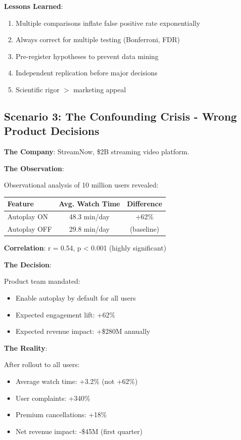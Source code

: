 \textbf{Lessons Learned}:

\begin{enumerate}
    \item Multiple comparisons inflate false positive rate exponentially
    \item Always correct for multiple testing (Bonferroni, FDR)
    \item Pre-register hypotheses to prevent data mining
    \item Independent replication before major decisions
    \item Scientific rigor $>$ marketing appeal
\end{enumerate}

\subsection{Scenario 3: The Confounding Crisis - Wrong Product Decisions}

\textbf{The Company}: StreamNow, \$2B streaming video platform.

\textbf{The Observation}:

Observational analysis of 10 million users revealed:

\begin{center}
\begin{tabular}{lcc}
\hline
\textbf{Feature} & \textbf{Avg. Watch Time} & \textbf{Difference} \\
\hline
Autoplay ON & 48.3 min/day & +62\% \\
Autoplay OFF & 29.8 min/day & (baseline) \\
\hline
\end{tabular}
\end{center}

\textbf{Correlation}: r = 0.54, p < 0.001 (highly significant)

\textbf{The Decision}:

Product team mandated:
\begin{itemize}
    \item Enable autoplay by default for all users
    \item Expected engagement lift: +62\%
    \item Expected revenue impact: +\$280M annually
\end{itemize}

\textbf{The Reality}:

After rollout to all users:
\begin{itemize}
    \item Average watch time: +3.2\% (not +62\%)
    \item User complaints: +340\%
    \item Premium cancellations: +18\%
    \item Net revenue impact: -\$45M (first quarter)
\end{itemize}

